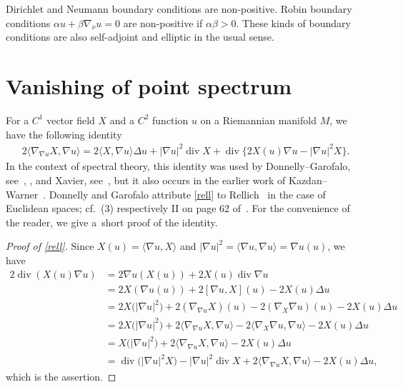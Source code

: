 \documentclass[10pt,a4paper]{amsart}
\numberwithin{equation}{section}
\DeclareMathOperator{\diver}{div}
\begin{document}
\begin{exas}
Dirichlet and Neumann boundary conditions are non-positive.
Robin boundary conditions $\alpha u+\beta\nabla_\nu u=0$ are non-positive if $\alpha\beta>0$.
These kinds of boundary conditions are also self-adjoint and elliptic in the usual sense.
\end{exas}

\section{Vanishing of point spectrum}\label{secrell}

For a $C^1$ vector field $X$ and a $C^2$ function $u$ on a Riemannian manifold $M$, we have the following identity
\begin{align}
 2\langle\nabla_{\nabla u}X,\nabla u\rangle
 = 2\langle X,\nabla u\rangle\Delta u + |\nabla u|^2\diver X + \diver\big\{2X(u)\nabla u-|\nabla u|^2X\big\}. \label{rell}
\end{align}
In the context of spectral theory, this identity was used by Donnelly--Garofalo,
see~\cite[Lemma~2.1]{DoGa92}, \cite[Proposition 3.1]{DoGa97}, and Xavier, see~\cite[identity~(1)]{Xavier1988},
but it also occurs in the earlier work of Kazdan--Warner~\cite[identity~(8.1)]{KazdanWarner74c}.
Donnelly and Garofalo attribute \eqref{rell} to Rellich~\cite{Rellich43} in the case of Euclidean spaces;
cf.~(3) respectively II on page 62 of~\cite{Rellich43}.
For the convenience of the reader, we give a~short proof of the identity.

\begin{proof}[Proof of \eqref{rell}]
Since $X(u)=\langle\nabla u, X\rangle$ and $|\nabla u|^2=\langle\nabla u,\nabla u\rangle=\nabla u(u)$, we have
\begin{align*}
 2\diver(X(u)\nabla u)
 &= 2\nabla u(X(u)) + 2X(u)\diver\nabla u \\
 &= 2X(\nabla u(u)) + 2[\nabla u,X](u) - 2X(u)\Delta u \\
 &= 2X\bigl(|\nabla u|^2\bigr) + 2(\nabla_{\nabla u}X)(u) - 2(\nabla_X\nabla u)(u) - 2X(u)\Delta u \\
 &= 2X\bigl(|\nabla u|^2\bigr) + 2\langle\nabla_{\nabla u}X,\nabla u\rangle - 2\langle\nabla_X\nabla u,\nabla u\rangle - 2X(u)\Delta u \\
 &= X\bigl(|\nabla u|^2\bigr) + 2\langle\nabla_{\nabla u}X,\nabla u\rangle - 2X(u)\Delta u \\
 &= \diver\bigl(|\nabla u|^2X\bigr) - |\nabla u|^2\diver X + 2\langle\nabla_{\nabla u}X,\nabla u\rangle - 2X(u)\Delta u,
\end{align*}
which is the assertion.
\end{proof}
\end{document}
